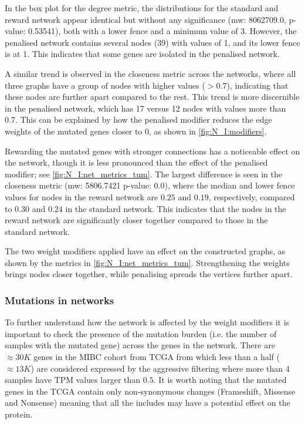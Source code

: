 In the box plot for the degree metric, the distributions for the standard and reward network appear identical but without any significance (\acrshort{mw}: 8062709.0, p-value: 0.53541), both with a lower fence and a minimum value of 3. However, the penalised network contains several nodes (39) with values of 1, and its lower fence is at 1. This indicates that some genes are isolated in the penalised network. 

A similar trend is observed in the closeness metric across the networks, where all three graphs have a group of nodes with higher values ($>$0.7),  indicating that these nodes are further apart compared to the rest. This trend is more discernible in the penalised network, which has 17 versus 12 nodes with values more than 0.7. This can be explained by how the penalised modifier reduces the edge weights of the mutated genes closer to 0, as shown in \cref{fig:N_I:modifiers}.

Rewarding the mutated genes with stronger connections has a noticeable effect on the network, though it is less pronounced than the effect of the penalised modifier; see \cref{fig:N_I:net_metrics_tum}. The largest difference is seen in the closeness metric (\acrshort{mw}: 5806.7421 p-value: 0.0), where the median and lower fence values for nodes in the reward network are $0.25$ and $0.19$, respectively, compared to $0.30$ and $0.24$ in the standard network. This indicates that the nodes in the reward network are significantly closer together compared to those in the standard network.

The two weight modifiers applied have an effect on the constructed graphs, as shown by the metrics in \cref{fig:N_I:net_metrics_tum}. Strengthening the weights brings nodes closer together, while penalising spreads the vertices further apart. 

\subsubsection*{Mutations in networks} \label{s:N_I:mut_rep}

To further understand how the network is affected by the weight modifiers it is important to check the presence of the mutation burden (i.e. the number of samples with the mutated gene) across the genes in the network. There are $\approx30K$ genes in the MIBC cohort from TCGA from which less than a half ($\approx13K$) are considered expressed by the aggressive filtering where more than 4 samples have TPM values larger than $0.5$. It is worth noting that the mutated genes in the TCGA contain only non-synonymous changes (Frameshift, Missense and Nonsense) meaning that all the includes may have a potential effect on the protein. 

